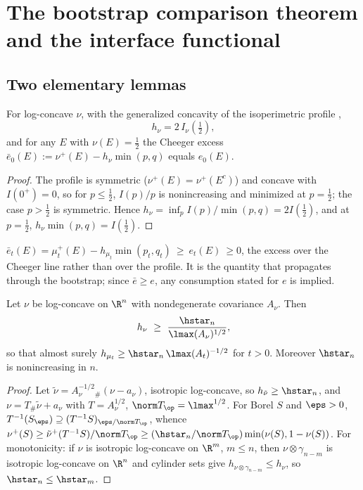 \documentclass[../../main.tex]{subfiles}
\begin{document}
\section{The bootstrap comparison theorem and the interface functional}
\label{sec:bootstrap}

\subsection{Two elementary lemmas}

\begin{lemma}
\label{lem:half}
For log-concave $\nu$, with the generalized concavity of the isoperimetric profile
\cite{Bobkov1999LogConcave,Milman2009Isoperimetric},
\[
  h_\nu=2\,I_\nu(\tfrac12),
\]
and for any $E$ with $\nu(E)=\tfrac12$ the Cheeger excess
$\bar e_0(E):=\nu^+(E)-h_\nu\min(p,q)$ equals $e_0(E)$.
\end{lemma}

\begin{proof}
The profile is symmetric ($\nu^+(E)=\nu^+(E^c)$) and concave with $I(0^+)=0$, so for
$p\le\tfrac12$, $I(p)/p$ is nonincreasing and minimized at $p=\tfrac12$; the case
$p>\tfrac12$ is symmetric. Hence $h_\nu=\inf_pI(p)/\min(p,q)=2I(\tfrac12)$, and at $p=\tfrac12$,
$h_\nu\min(p,q)=I(\tfrac12)$.
\end{proof}

\begin{definition}
\label{def:cheeger-excess}
$\bar e_t(E)=\mu_t^+(E)-h_{\mu_t}\min(p_t,q_t)\ \ge\ e_t(E)\ \ge0$, the excess over the Cheeger
line rather than over the profile. It is the quantity that propagates through the bootstrap;
since $\bar e\ge e$, any consumption stated for $e$ is implied.
\end{definition}

\begin{lemma}
\label{lem:whitening}
Let $\nu$ be log-concave on $\R^n$ with nondegenerate covariance $A_\nu$. Then
\[
  h_\nu\ \ge\ \frac{\hstar_n}{\lmax(A_\nu)^{1/2}} ,
\]
so that almost surely $h_{\mu_t}\ge\hstar_n\,\lmax(A_t)^{-1/2}$ for $t>0$. Moreover $\hstar_n$
is nonincreasing in $n$.
\end{lemma}

\begin{proof}
Let $\tilde\nu=A_\nu^{-1/2}{}_\#(\nu-a_\nu)$, isotropic log-concave, so
$h_{\tilde\nu}\ge\hstar_n$, and $\nu=T_\#\tilde\nu+a_\nu$ with $T=A_\nu^{1/2}$,
$\norm T_\op=\lmax^{1/2}$. For Borel $S$ and $\eps>0$,
$T^{-1}(S_\eps)\supseteq(T^{-1}S)_{\eps/\norm T_\op}$, whence
$\nu^+(S)\ge\tilde\nu^+(T^{-1}S)/\norm T_\op\ge(\hstar_n/\norm T_\op)\min(\nu(S),1-\nu(S))$.
For monotonicity: if $\nu$ is isotropic log-concave on $\R^m$, $m\le n$, then
$\nu\otimes\gamma_{n-m}$ is isotropic log-concave on $\R^n$ and cylinder sets give
$h_{\nu\otimes\gamma_{n-m}}\le h_\nu$, so $\hstar_n\le\hstar_m$.
\end{proof}
\end{document}

